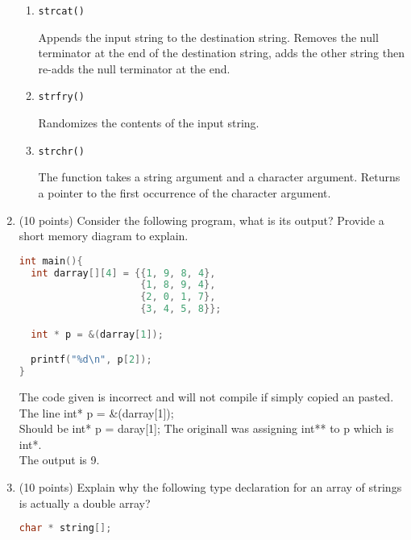 \documentclass{article}[9pt]
\newenvironment{answerfont}{\fontfamily{qhv}\selectfont}{\par}
\newenvironment{myanswer}{\begin{mdframed}\begin{answerfont}}{\end{answerfont}\end{mdframed}}
\begin{document}
\begin{enumerate}
\begin{enumerate}
\item \texttt{strcat()}
\begin{myanswer}
Appends the input string to the destination string. Removes the null terminator at the end of the destination string, adds the other string
then re-adds the null terminator at the end.
\end{myanswer}

\item \texttt{strfry()}
\begin{myanswer}
Randomizes the contents of the input string.
\end{myanswer}

\item \texttt{strchr()}
\begin{myanswer}
The function takes a string argument and a character argument. Returns a pointer to the first occurrence of the character argument.
\end{myanswer}

\end{enumerate}

\item (10 points) Consider the following program, what is its output? Provide a
short memory diagram to explain.

\begin{lstlisting}[language=c]
int main(){
  int darray[][4] = {{1, 9, 8, 4},
                     {1, 8, 9, 4},
                     {2, 0, 1, 7},
                     {3, 4, 5, 8}};

  int * p = &(darray[1]);

  printf("%d\n", p[2]);
}
\end{lstlisting}

\begin{myanswer}
The code given is incorrect and will not compile if simply copied an pasted.\\
The line int* p = &(darray[1]);\\
Should be int* p = daray[1]; The originall was assigning int** to p which is int*.\\
The output is 9.
\end{myanswer}


\item (10 points) Explain why the following type declaration for an array of strings is actually a double array?

\begin{lstlisting}[language=c]
char * string[];
\end{lstlisting}


\end{enumerate}
\end{document}
